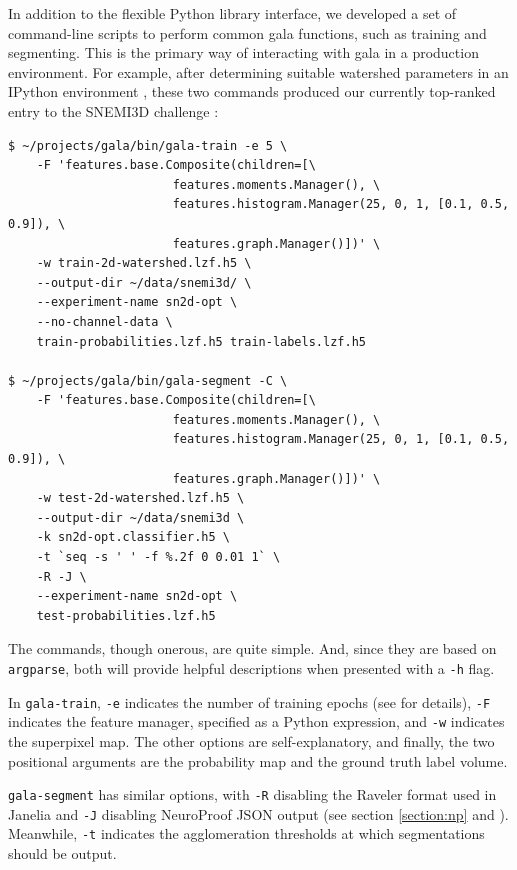 \documentclass{frontiersSCNS} %
\begin{document}
In addition to the flexible Python library interface, we developed a set of command-line scripts to perform common gala functions, such as training and segmenting.
This is the primary way of interacting with gala in a production environment.
For example, after determining suitable watershed parameters in an IPython environment \citep{Perez:2007}, these two commands produced our currently top-ranked entry to the SNEMI3D challenge \citep{snemi}:

{\small
\begin{verbatim}
$ ~/projects/gala/bin/gala-train -e 5 \
    -F 'features.base.Composite(children=[\
                       features.moments.Manager(), \
                       features.histogram.Manager(25, 0, 1, [0.1, 0.5, 0.9]), \
                       features.graph.Manager()])' \
    -w train-2d-watershed.lzf.h5 \
    --output-dir ~/data/snemi3d/ \
    --experiment-name sn2d-opt \
    --no-channel-data \
    train-probabilities.lzf.h5 train-labels.lzf.h5 

$ ~/projects/gala/bin/gala-segment -C \
    -F 'features.base.Composite(children=[\
                       features.moments.Manager(), \
                       features.histogram.Manager(25, 0, 1, [0.1, 0.5, 0.9]), \
                       features.graph.Manager()])' \
    -w test-2d-watershed.lzf.h5 \
    --output-dir ~/data/snemi3d \
    -k sn2d-opt.classifier.h5 \
    -t `seq -s ' ' -f %.2f 0 0.01 1` \
    -R -J \
    --experiment-name sn2d-opt \
    test-probabilities.lzf.h5
\end{verbatim}
}

The commands, though onerous, are quite simple.
And, since they are based on \texttt{\small argparse}, both will provide helpful descriptions when presented with a \texttt{\small -h} flag.

In \texttt{\small gala-train}, \texttt{\small -e} indicates the number of training epochs (see \cite{NunezIglesias:2013cd} for details), \texttt{\small -F} indicates the feature manager, specified as a Python expression, and \texttt{\small -w} indicates the superpixel map.
The other options are self-explanatory, and finally, the two positional arguments are the probability map and the ground truth label volume.

\texttt{\small gala-segment} has similar options, with \texttt{\small -R} disabling the Raveler format \citep{raveler} used in Janelia and \texttt{\small -J} disabling NeuroProof JSON output (see section \ref{section:np} and \cite{np}).
Meanwhile, \texttt{\small -t} indicates the agglomeration thresholds at which segmentations should be output.
\end{document}
